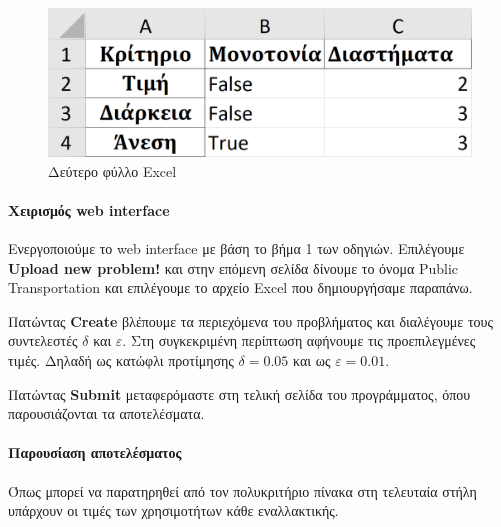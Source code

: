 \documentclass[11pt,a4paper,titlepage]{article}
\numberwithin{equation}{section}
\begin{document}
\begin{figure}[H]
	\centering
	\includegraphics[width=0.7\linewidth]{media/excel_sheet_2.png}
	\caption{Δεύτερο φύλλο Excel}
	\label{fig:excel_sheet_2}
\end{figure}

\paragraph{Χειρισμός web interface}
Ενεργοποιούμε το web interface με βάση το βήμα 1 των οδηγιών. Επιλέγουμε \textbf{Upload new problem!} και στην επόμενη σελίδα δίνουμε το όνομα Public Transportation και επιλέγουμε το αρχείο Excel που δημιουργήσαμε παραπάνω.

Πατώντας \textbf{Create} βλέπουμε τα περιεχόμενα του προβλήματος και διαλέγουμε τους συντελεστές $δ$ και $ε$. Στη συγκεκριμένη περίπτωση αφήνουμε τις προεπιλεγμένες τιμές. Δηλαδή ως κατώφλι προτίμησης $δ = 0.05$ και ως $ε = 0.01$.

Πατώντας \textbf{Submit} μεταφερόμαστε στη τελική σελίδα του προγράμματος, όπου παρουσιάζονται τα αποτελέσματα.

\paragraph{Παρουσίαση αποτελέσματος}
Όπως μπορεί να παρατηρηθεί από τον πολυκριτήριο πίνακα στη τελευταία στήλη υπάρχουν οι τιμές των χρησιμοτήτων κάθε εναλλακτικής.
\end{document}
